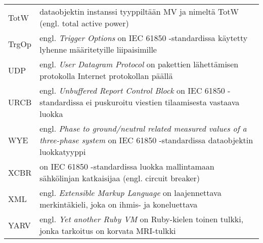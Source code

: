 \begin{tabularx}{\linewidth}[h]{@{} p{} p{} @{}}
	TotW & dataobjektin instanssi tyyppiltään MV ja nimeltä TotW (engl. total active power) \\
	TrgOp & engl. \emph{Trigger Options} on IEC 61850 -standardissa käytetty lyhenne määritetyille liipaisimille \\
	UDP & engl. \emph{User Datagram Protocol} on pakettien lähettämisen protokolla Internet protokollan päällä \\
	URCB & engl. \emph{Unbuffered Report Control Block} on IEC 61850 -standardissa ei puskuroitu viestien tilaamisesta vastaava luokka \\
	WYE & engl. \emph{Phase to ground/neutral related measured values of a three-phase system} on IEC 61850 -standardissa dataobjektin luokkatyyppi \\
	XCBR & on IEC 61850 -standardissa luokka mallintamaan sähkölinjan katkaisijaa (engl. circuit breaker) \\
	XML & engl. \emph{Extensible Markup Language} on laajennettava merkintäkieli, joka on ihmis- ja koneluettava \\
	YARV & engl. \emph{Yet another Ruby VM} on Ruby-kielen toinen tulkki, jonka tarkoitus on korvata MRI-tulkki \\
\end{tabularx}